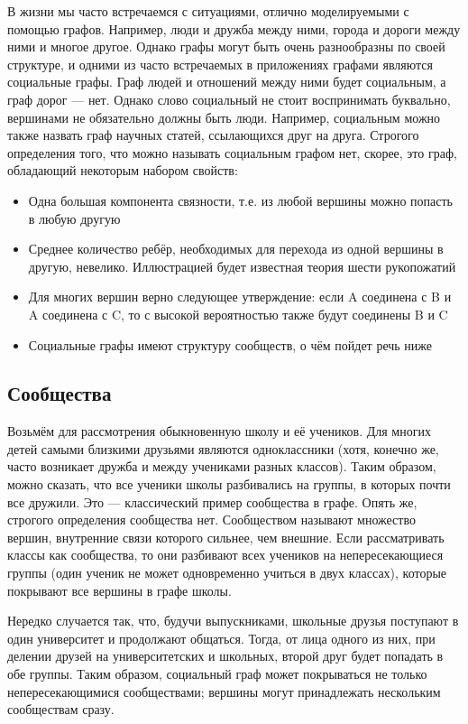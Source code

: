 \documentclass[12pt]{article}
\begin{document}
В жизни мы часто встречаемся с ситуациями, отлично моделируемыми с помощью графов. Например, люди и дружба между ними, города и дороги между ними и многое другое. Однако графы могут быть очень разнообразны по своей структуре, и одними из часто встречаемых в приложениях графами являются социальные графы. Граф людей и отношений между ними будет социальным, а граф дорог --- нет. Однако слово социальный не стоит воспринимать буквально, вершинами не обязательно должны быть люди. Например, социальным можно также назвать граф научных статей, ссылающихся друг на друга. Строгого определения того, что можно называть социальным графом нет, скорее, это граф, обладающий некоторым набором свойств:
\begin{itemize}
\item Одна большая компонента связности, т.е. из любой вершины можно попасть в любую другую
\item Среднее количество ребёр, необходимых для перехода из одной вершины в другую, невелико. Иллюстрацией будет известная теория шести рукопожатий
\item Для многих вершин верно следующее утверждение: если A соединена с B и A соединена с C, то с высокой вероятностью также будут соединены B и C
\item Социальные графы имеют структуру сообществ, о чём пойдет речь ниже
\end{itemize} 

\subsection{Сообщества}

Возьмём для рассмотрения обыкновенную школу и её учеников. Для многих детей самыми близкими друзьями являются одноклассники (хотя, конечно же, часто возникает дружба и между учениками разных классов). Таким образом, можно сказать, что все ученики школы разбивались на группы, в которых почти все дружили. Это --- классический пример сообщества в графе. Опять же, строгого определения сообщества нет. Сообществом называют множество вершин, внутренние связи которого сильнее, чем внешние. Если рассматривать классы как сообщества, то они разбивают всех учеников на непересекающиеся группы (один ученик не может одновременно учиться в двух классах), которые покрывают все вершины в графе школы.

Нередко случается так, что, будучи выпускниками, школьные друзья поступают в один университет и продолжают общаться. Тогда, от лица одного из них, при делении друзей на университетских и школьных, второй друг будет попадать в обе группы. Таким образом, социальный граф может покрываться не только непересекающимися сообществами; вершины могут принадлежать нескольким сообществам сразу.
\end{document}
